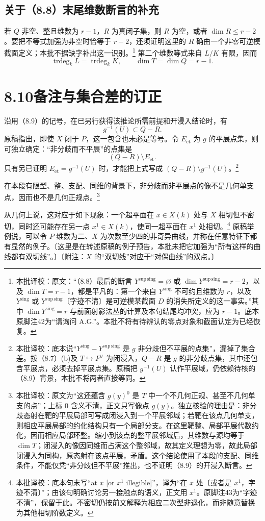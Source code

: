 \documentclass{ctexbook}
\newcommand{\corr}[1]{\footnote{本批译校：#1}}
\newcommand{\Ys}{Y^{\mathrm{sing}}}
\newcommand{\Yss}{Y^{\mathrm{sup\,sing}}}
\begin{document}
\section*{关于（8.8）末尾维数断言的补充}
若 $Q$ 非空、整且维数为 $r-1$，$R$ 为真闭子集，则 $R$ 为空，或者 $\dim R\leq r-2$。要把不等式加强为非空时恰等于 $r-2$，还须证明这里的 $R$ 确由一个非零可逆模截面定义；本批不据缺字补出这一识别。\corr{原文：“（8.8）最后的断言 $\Yss=\varnothing$ 或 $\dim\Yss=r-2$，以及 $\dim T=r-1$，都是平凡的：第一个来自 $\Ys$ 不可约且维数为 $r$，以及 $\Ys$ 或 $\Yss$〔字迹不清〕是可逆模某截面 $D$ 的消失所定义的这一事实。”其中 $\dim\Ys=r$ 与前面射影法丛的计算及本句结尾均冲突，应为 $r-1$。底本原脚注42为“请询问 A.G.”。本批不将有待辨认的零点对象和截面认定为已经恢复。}
第二个维数等式来自 $L/K$ 有限，因而
\[
\operatorname{trdeg}_k L=\operatorname{trdeg}_k K,
\qquad\dim T=\dim Q=r-1.
\]

\chapter*{8.10\quad 备注与集合差的订正}
沿用（8.9）的记号，在已另行获得该推论所需前提和开浸入结论时，有
\[
g^{-1}(U)\subset Q-R.
\]
原稿指出，即使 $X$ 闭于 $P$，这一包含也未必是等号。令 $E_{\mathrm{et}}$ 为 $g$ 的平展点集，则可独立确定：“非分歧而不平展”的点集是
\[
(Q-R)\setminus E_{\mathrm{et}}.
\]
只有另已证明 $E_{\mathrm{et}}=g^{-1}(U)$ 时，才能把上式写成 $(Q-R)\setminus g^{-1}(U)$。\corr{底本说“$\Ys-\Yss$ 是 $g$ 非分歧但不平展的点集”，漏掉了集合差。按（8.7）(b)及 $T\hookrightarrow P^\vee$ 为闭浸入，$Q-R$ 是 $g$ 的非分歧点集，其中还包含平展点，必须去掉平展点集。原稿把 $g^{-1}(U)$ 认作平展域，仍依赖待核的（8.9）背景，本批不将两者直接等同。}

在本段有限型、整、支配、同维的背景下，非分歧而非平展点的像不是几何单支点，因而也不是几何正规点。\corr{原文为“这还蕴含 $g(y)^0$ 是 $T$ 中一个不几何正规、甚至不几何单支的点”；上标 $0$ 含义不清，正文只写像点 $g(y)$。独立核验的理由是：非分歧态射在靶的平展局部可写成闭浸入到一个平展邻域；若靶在该点几何单支，则相应平展局部的约化结构只有一个局部分支。在这里靶整、局部平展代数约化，因而相应局部环整。缩小到该点的整平展邻域后，其维数与源均等于 $\dim T$；闭浸入的像因同维而占满这个整邻域，故其定义理想为零，故此局部闭浸入为同构，原态射在该点平展，矛盾。这个结论使用了本段的支配、同维条件，不能仅凭“非分歧但不平展”推出，也不证明（8.9）的开浸入断言。}

从几何上说，这对应于如下现象：一个超平面在 $x\in X(k)$ 处与 $X$ 相切但不密切，同时还可能存在另一点 $x^1\in X(k)$，使同一超平面在 $x^1$ 处相切。\corr{底本句末写“at $x$ [or $x^1$ illegible]”，译为“在 $x$ 处〔或者是 $x^1$，字迹不清〕”；由该句明确讨论另一接触点的语义，正文用 $x^1$。原脚注43为“字迹不清”，保留于此。不密切仍按前文解释为相应二次型非退化，而非随意替换为其他相切阶数定义。}
原稿举例说，可以令 $P$ 维数为二、$X$ 为次数至少四的非奇异曲线，并称在任意特征下都有显然的例子。〔这里是在转述原稿的例子预告，本批未把它加强为“所有这样的曲线都有双切线”。〕〔附注：$X$ 的“双切线”对应于“对偶曲线”的双点。〕
\end{document}
